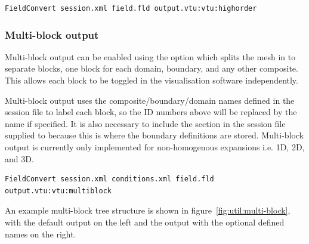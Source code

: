 \begin{lstlisting}[style=BashInputStyle]
FieldConvert session.xml field.fld output.vtu:vtu:highorder
\end{lstlisting}

\subsubsection{Multi-block output}
Multi-block output can be enabled using the option  which splits
the mesh in to separate blocks, one block for each domain, boundary, and any other
composite. This allows each block to be toggled in the visualisation software
independently.

Multi-block output uses the composite/boundary/domain names defined in the session file
to label each block, so the ID numbers above will be replaced by the name if
specified. It is also necessary to include the  section in the
session file supplied to  because this is where the boundary
definitions are stored. Multi-block output is currently only implemented for
non-homogenous expansions i.e. 1D, 2D, and 3D.

\begin{lstlisting}[style=BashInputStyle]
FieldConvert session.xml conditions.xml field.fld output.vtu:vtu:multiblock
\end{lstlisting}

An example multi-block tree structure is shown in figure~\ref{fig:util:multi-block},
with the default output on the left and the output with the optional defined names
on the right.

